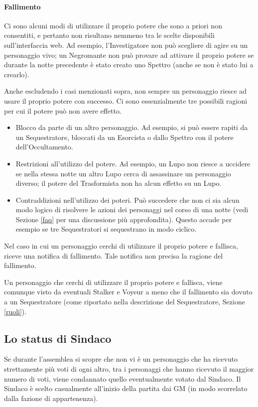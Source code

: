 \documentclass[a4paper,10pt]{article}
\begin{document}
\paragraph{Fallimento} Ci sono alcuni modi di utilizzare il proprio potere che sono a priori non consentiti, e pertanto non risultano nemmeno tra le scelte disponibili sull'interfaccia web. Ad esempio, l'Investigatore non può scegliere di agire su un personaggio vivo; un Negromante non può provare ad attivare il proprio potere se durante la notte precedente è stato creato uno Spettro (anche se non è stato lui a crearlo).

Anche escludendo i casi menzionati sopra, non sempre un personaggio riesce ad usare il proprio potere con successo. Ci sono essenzialmente tre possibili ragioni per cui il potere può non avere effetto.
\begin{itemize}
 \item Blocco da parte di un altro personaggio. Ad esempio, si può essere rapiti da un Sequestratore, bloccati da un Esorcista o dallo Spettro con il potere dell'Occultamento.
 \item Restrizioni all'utilizzo del potere. Ad esempio, un Lupo non riesce a uccidere se nella stessa notte un altro Lupo cerca di assassinare un personaggio diverso; il potere del Trasformista non ha alcun effetto su un Lupo.
 \item Contraddizioni nell'utilizzo dei poteri. Può succedere che non ci sia alcun modo logico di risolvere le azioni dei personaggi nel corso di una notte (vedi Sezione \ref{faq} per una discussione più approfondita). Questo accade per esempio se tre Sequestratori si sequestrano in modo ciclico.
\end{itemize}
Nel caso in cui un personaggio cerchi di utilizzare il proprio potere e fallisca, riceve una notifica di fallimento. Tale notifica non precisa la ragione del fallimento.

Un personaggio che cerchi di utilizzare il proprio potere e fallisca, viene comunque visto da eventuali Stalker e Voyeur a meno che il fallimento sia dovuto a un Sequestratore (come riportato nella descrizione del Sequestratore, Sezione \ref{ruoli}).

\subsection{Lo status di Sindaco}
\label{sindaco}

Se durante l'assemblea si scopre che non vi è un personaggio che ha ricevuto strettamente più voti di ogni altro, tra i personaggi che hanno ricevuto il maggior numero di voti, viene condannato quello eventualmente votato dal
Sindaco.
Il Sindaco è scelto casualmente all'inizio della partita dai GM (in modo scorrelato dalla fazione di appartenenza).
\end{document}
